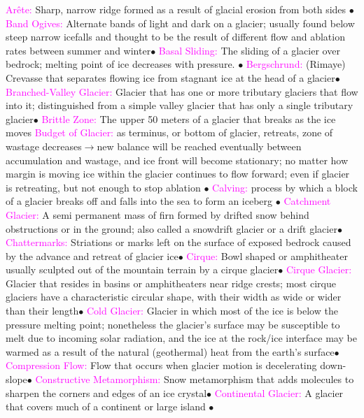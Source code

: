 \documentclass{article}
\newcommand{\ddd}{$\bullet$}
\newcommand{\pink}[1]{\textcolor{magenta}{#1}}
\newcommand{\vocab}[1]{{\pink{#1}}}
\begin{document}
\begin{multicols*}{4}
		\vocab{        Arête: } Sharp, narrow ridge formed as a result of glacial erosion from both sides \ddd 
		\vocab{        Band Ogives: } Alternate bands of light and dark on a glacier; usually found below steep narrow icefalls and thought to be the result of different flow and ablation rates between summer and winter\ddd
		\vocab{        Basal Sliding: } The sliding of a glacier over bedrock; melting point of ice decreases with pressure. \ddd
		\vocab{        Bergschrund: } (Rimaye) Crevasse that separates flowing ice from stagnant ice at the head of a glacier\ddd
		\vocab{        Branched-Valley Glacier: } Glacier that has one or more tributary glaciers that flow into it; distinguished from a simple valley glacier that has only a single tributary glacier\ddd
		\vocab{       Brittle Zone: }The upper 50 meters of a glacier that breaks as the ice moves
		\vocab{Budget of Glacier: } as terminus, or bottom of glacier, retreats, zone of wastage decreases$ \rightarrow $new balance will be reached eventually between accumulation and wastage, and ice front will become stationary; no matter how margin is moving ice within the glacier continues to flow forward; even if glacier is retreating, but not enough to stop ablation \ddd
		\vocab{Calving: } process by which a block of a glacier breaks off and falls into the sea to form an iceberg \ddd
		\vocab{        Catchment Glacier: } A semi permanent mass of firn formed by drifted snow behind obstructions or in the ground; also called a snowdrift glacier or a drift glacier\ddd
		\vocab{        Chattermarks: } Striations or marks left on the surface of exposed bedrock caused by the advance and retreat of glacier ice\ddd
		\vocab{        Cirque: } Bowl shaped or amphitheater usually sculpted out of the mountain terrain by a cirque glacier\ddd
		\vocab{        Cirque Glacier: } Glacier that resides in basins or amphitheaters near ridge crests; most cirque glaciers have a characteristic circular shape, with their width as wide or wider than their length\ddd
		\vocab{        Cold Glacier: } Glacier in which most of the ice is below the pressure melting point; nonetheless the glacier’s surface may be susceptible to melt due to incoming solar radiation, and the ice at the rock/ice interface may be warmed as a result of the natural (geothermal) heat from the earth’s surface\ddd
		\vocab{        Compression Flow: } Flow that occurs when glacier motion is decelerating down-slope\ddd
		\vocab{        Constructive Metamorphism: } Snow metamorphism that adds molecules to sharpen the corners and edges of an ice crystal\ddd
		\vocab{ Continental Glacier: }A glacier that covers much of a continent or large island \ddd

\end{multicols*}
\end{document}
